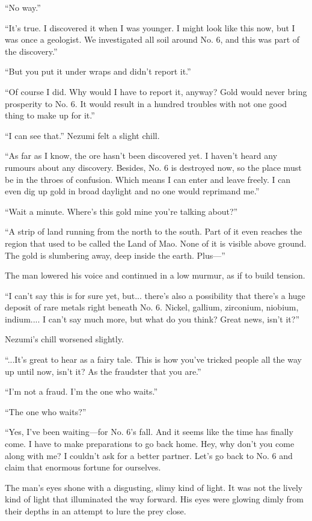 ``No way.''

``It's true. I discovered it when I was younger. I might look like this
now, but I was once a geologist. We investigated all soil around No. 6,
and this was part of the discovery.''

``But you put it under wraps and didn't report it.''

``Of course I did. Why would I have to report it, anyway? Gold would
never bring prosperity to No. 6. It would result in a hundred troubles
with not one good thing to make up for it.''

``I can see that.'' Nezumi felt a slight chill.

``As far as I know, the ore hasn't been discovered yet. I haven't heard
any rumours about any discovery. Besides, No. 6 is destroyed now, so the
place must be in the throes of confusion. Which means I can enter and
leave freely. I can even dig up gold in broad daylight and no one would
reprimand me.''

``Wait a minute. Where's this gold mine you're talking about?''

``A strip of land running from the north to the south. Part of it even
reaches the region that used to be called the Land of Mao. None of it is
visible above ground. The gold is slumbering away, deep inside the
earth. Plus---''

The man lowered his voice and continued in a low murmur, as if to build
tension.

``I can't say this is for sure yet, but... there's also a possibility
that there's a huge deposit of rare metals right beneath No. 6. Nickel,
gallium, zirconium, niobium, indium.... I can't say much more, but what
do you think? Great news, isn't it?''

Nezumi's chill worsened slightly.

``...It's great to hear as a fairy tale. This is how you've tricked
people all the way up until now, isn't it? As the fraudster that you
are.''

``I'm not a fraud. I'm the one who waits.''

``The one who waits?''

``Yes, I've been waiting---for No. 6's fall. And it seems like the time
has finally come. I have to make preparations to go back home. Hey, why
don't you come along with me? I couldn't ask for a better partner. Let's
go back to No. 6 and claim that enormous fortune for ourselves.

The man's eyes shone with a disgusting, slimy kind of light. It was not
the lively kind of light that illuminated the way forward. His eyes were
glowing dimly from their depths in an attempt to lure the prey close.

